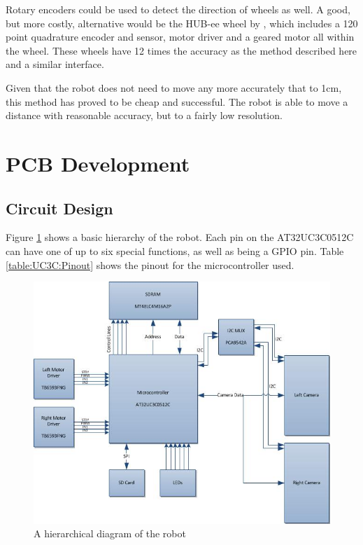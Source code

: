 Rotary encoders could be used to detect the direction of wheels as well. A good, but more costly, alternative would be the HUB-ee wheel by \cite{Creative_Robotics}, which includes a 120 point quadrature encoder and sensor, motor driver and a geared motor all within the wheel. These wheels have 12 times the accuracy as the method described here and a similar interface. 
 
Given that the robot does not need to move any more accurately that to 1cm, this method has proved to be cheap and successful. The robot is able to move a distance with reasonable accuracy, but to a fairly low resolution.

\section{PCB Development}\label{Section:PCB_Dev}
\subsection{Circuit Design}

Figure \ref{fig:Hierarchical} shows a basic hierarchy of the robot. Each pin on the AT32UC3C0512C can have one of up to six special functions, as well as being a GPIO pin.  Table \ref{table:UC3C:Pinout} shows the pinout for the microcontroller used. 
\begin{figure}
\includegraphics[width=\textwidth]{Figures/hierarchy.jpg}
\caption{A hierarchical diagram of the robot}
\label{fig:Hierarchical}
\end{figure}

